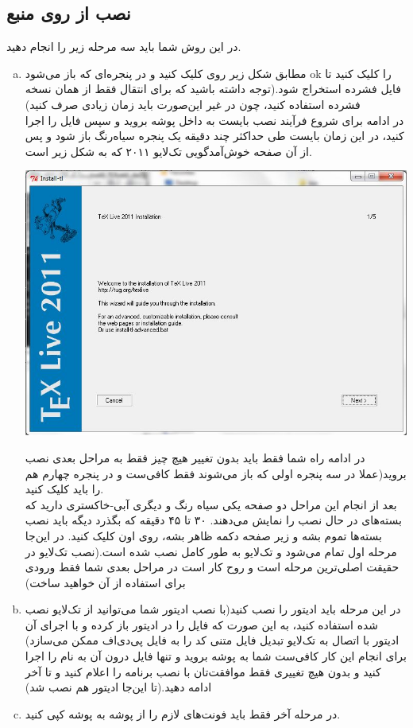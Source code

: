 \subsection{نصب از روی منبع}
در این روش شما باید سه مرحله زیر را انجام دهید.
\begin{enumerate}[a.]
\item
مطابق شکل زیر روی  کلیک کنید و در پنجره‌ای که باز می‌شود ok را کلیک کنید تا فایل فشرده استخراج شود.(توجه داشته باشید که برای انتقال فقط از همان نسخه فشرده استفاده کنید، چون در غیر این‌صورت باید زمان زیادی صرف کنید)\\
در ادامه برای شروع فرآیند نصب بایست به داخل پوشه  بروید و سپس فایل  را اجرا کنید، در این زمان بایست طی حداکثر چند دقیقه یک پنجره سیاه‌رنگ باز شود و پس از آن صفحه خوش‌آمدگویی تک‌لایو ۲۰۱۱ که به شکل زیر است.

\includegraphics[scale=.5]{fig/welcome}

در ادامه راه شما فقط باید بدون تغییر هیچ چیز فقط به مراحل بعدی نصب بروید(عملا در سه پنجره اولی که باز می‌شوند فقط کافی‌ست  و در پنجره چهارم هم  را باید کلیک کنید.\\
بعد از انجام این مراحل دو صفحه یکی سیاه رنگ و دیگری آبی‌-خاکستری دارید که بسته‌های در حال نصب را نمایش می‌دهند. ۳۰ تا ۴۵ دقیقه که بگذرد دیگه باید نصب بسته‌ها تموم بشه و زیر صفحه دکمه  ظاهر بشه، روی اون کلیک کنید. در این‌جا مرحله اول تمام می‌شود و تک‌لایو به طور کامل نصب شده است.(نصب تک‌لایو در حقیقت اصلی‌ترین مرحله است و روح کار است در مراحل بعدی شما فقط ورودی برای استفاده از آن خواهید ساخت)
\item
در این مرحله باید ادیتور  را نصب کنید(با نصب ادیتور شما می‌توانید از تک‌لایو نصب شده استفاده کنید، به این صورت که فایل را در ادیتور باز کرده و با اجرای آن ادیتور با اتصال به تک‌لایو تبدیل فایل متنی کد را به فایل پی‌دی‌اف ممکن می‌سازد) برای انجام این کار کافی‌ست شما به پوشه  بروید و تنها فایل درون آن به نام 
 را اجرا کنید و بدون هیچ تغییری فقط موافقت‌تان با نصب برنامه را اعلام کنید و تا آخر ادامه دهید.(تا این‌جا ادیتور هم نصب شد)
\item
در مرحله آخر فقط باید فونت‌های لازم را از  پوشه  به پوشه  کپی کنید.
\end{enumerate}
